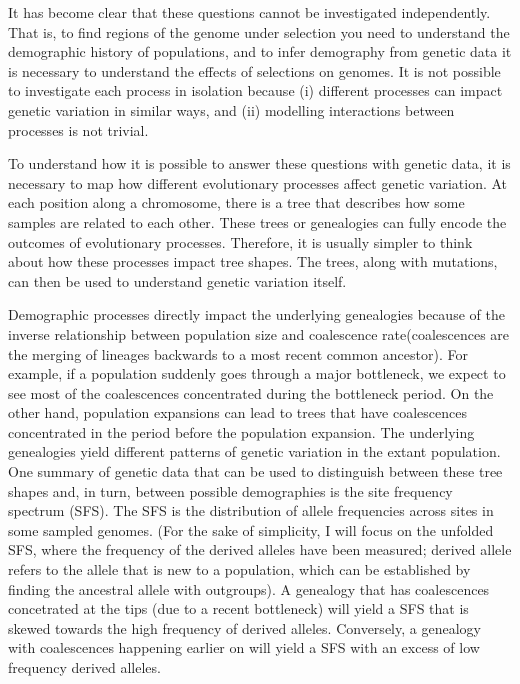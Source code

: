 It has become clear that these questions cannot be investigated independently.
That is, to find regions of the genome under selection you need to understand the demographic history of populations,
and to infer demography from genetic data it is necessary to understand the effects of selections on genomes.
It is not possible to investigate each process in isolation because
(i) different processes can impact genetic variation in similar ways,
and (ii) modelling interactions between processes is not trivial.

To understand how it is possible to answer these questions with genetic data,
it is necessary to map how different evolutionary processes affect genetic variation.
At each position along a chromosome, there is a tree that describes how some samples are related to each other.
These trees or genealogies can fully encode the outcomes of evolutionary processes.
Therefore, it is usually simpler to think about how these processes impact tree shapes.
The trees, along with mutations, can then be used to understand genetic variation itself.

Demographic processes directly impact the underlying genealogies because of the inverse relationship between population size and coalescence rate(coalescences are the merging of lineages backwards to a most recent common ancestor).
For example, if a population suddenly goes through a major bottleneck,
we expect to see most of the coalescences concentrated during the bottleneck period.
On the other hand, population expansions can lead to trees that have coalescences concentrated in the period before the population expansion.
The underlying genealogies yield different patterns of genetic variation in the extant population.
One summary of genetic data that can be used to distinguish between these tree shapes and, in turn, between possible demographies is the site frequency spectrum (SFS).
The SFS is the distribution of allele frequencies across sites in some sampled genomes.
(For the sake of simplicity, I will focus on the unfolded SFS, where the frequency of the derived alleles have been measured; derived allele refers to the allele that is new to a population, which can be established by finding the ancestral allele with outgroups).
A genealogy that has coalescences concetrated at the tips (due to a recent bottleneck) will yield a SFS that is skewed towards the high frequency of derived alleles.
Conversely, a genealogy with coalescences happening earlier on will yield a SFS with an excess of low frequency derived alleles.

